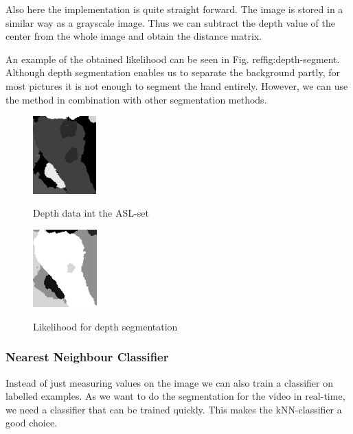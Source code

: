 \documentclass[letterpaper, 10 pt, conference]{ieeeconf}  %
\begin{document}
Also here the implementation is quite straight forward. The image is stored in a similar way as a grayscale image. Thus we can subtract the depth value of the center from the whole image and obtain the distance matrix.

An example of the obtained likelihood can be seen in Fig. ref{fig:depth-segment}. Although depth segmentation enables us to separate the background partly, for most pictures it is not enough to segment the hand entirely. However, we can use the method in combination with other segmentation methods.

\begin{figure}[ht!]
	\centering
	\begin{minipage}{0.4\linewidth}
		\centering
		\includegraphics[height=3cm]{asl-depth}
		\caption{Depth data int the ASL-set}
		\label{fig:asl-depth}
	\end{minipage}
	\hfill
\begin{minipage}{0.4\linewidth}
\centering
	\includegraphics[height=3cm]{depth-segment}
	\label{fig:depth-segment}
	\caption{Likelihood for depth segmentation}
	\end{minipage}
\end{figure}

\begin{figure}
\end{figure}


\subsubsection{Nearest Neighbour Classifier}

Instead of just measuring values on the image we can also train a classifier on labelled examples. As we want to do the segmentation for the video in real-time, we need a classifier that can be trained quickly. This makes the kNN-classifier a good choice.
\end{document}
